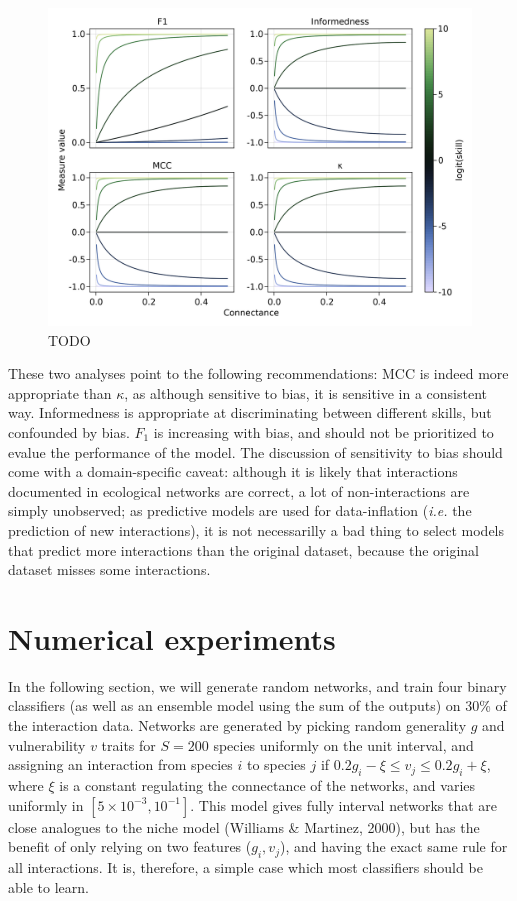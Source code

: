 \documentclass[10pt,oneside]{article}
\makeatletter
\def\maxwidth{\ifdim\Gin@nat@width>\linewidth\linewidth
\else\Gin@nat@width\fi}
\let\Oldincludegraphics\includegraphics
\renewcommand{\includegraphics}[1]{\Oldincludegraphics[width=\maxwidth]{#1}}
\makeatother
\begin{document}
\begin{figure}
\hypertarget{fig:connectance}{%
\centering
\includegraphics{figures/changing-connectance.png}
\caption{TODO}\label{fig:connectance}
}
\end{figure}

These two analyses point to the following recommendations: MCC is indeed
more appropriate than \(\kappa\), as although sensitive to bias, it is
sensitive in a consistent way. Informedness is appropriate at
discriminating between different skills, but confounded by bias. \(F_1\)
is increasing with bias, and should not be prioritized to evalue the
performance of the model. The discussion of sensitivity to bias should
come with a domain-specific caveat: although it is likely that
interactions documented in ecological networks are correct, a lot of
non-interactions are simply unobserved; as predictive models are used
for data-inflation (\emph{i.e.} the prediction of new interactions), it
is not necessarilly a bad thing to select models that predict more
interactions than the original dataset, because the original dataset
misses some interactions.

\hypertarget{numerical-experiments}{%
\section{Numerical experiments}\label{numerical-experiments}}

In the following section, we will generate random networks, and train
four binary classifiers (as well as an ensemble model using the sum of
the outputs) on 30\% of the interaction data. Networks are generated by
picking random generality \(g\) and vulnerability \(v\) traits for
\(S = 200\) species uniformly on the unit interval, and assigning an
interaction from species \(i\) to species \(j\) if
\(0.2g_i-\xi \le v_j \le 0.2g_i+\xi\), where \(\xi\) is a constant
regulating the connectance of the networks, and varies uniformly in
\([5\times 10^{-3}, 10^{-1}]\). This model gives fully interval networks
that are close analogues to the niche model (Williams \& Martinez,
2000), but has the benefit of only relying on two features
(\(g_i, v_j\)), and having the exact same rule for all interactions. It
is, therefore, a simple case which most classifiers should be able to
learn.
\end{document}
